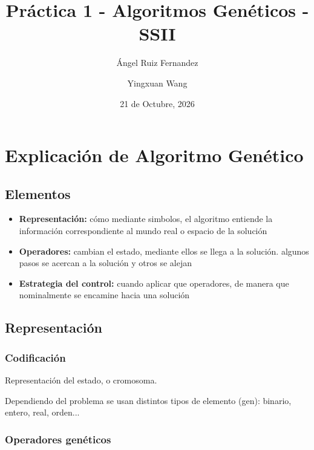 \documentclass[12pt]{article}
\title{Práctica 1 - Algoritmos Genéticos - SSII}
\date{21 de Octubre, 2026}
\author{Ángel Ruiz Fernandez \and Yingxuan Wang}
\begin{document}
    \maketitle
    \pagebreak

    \tableofcontents
    \pagebreak

    \section{Explicación de Algoritmo Genético}

    \subsection{Elementos}

    \begin{itemize}
    \item \textbf{Representación:} cómo mediante simbolos, el algoritmo entiende la información
     correspondiente al mundo real o espacio de la solución
    \item \textbf{Operadores:} cambian el estado, mediante ellos se llega a la solución. algunos
     pasos se acercan a la solución y otros se alejan
    \item \textbf{Estrategia del control:} cuando aplicar que operadores, de manera que nominalmente
     se encamine hacia una solución
    \end{itemize}

    \subsection{Representación}

    \subsubsection{Codificación}

    Representación del estado, o cromosoma.

    Dependiendo del problema se usan distintos tipos de elemento (gen): binario, entero, real, orden...

    \subsubsection{Operadores genéticos}
\end{document}
